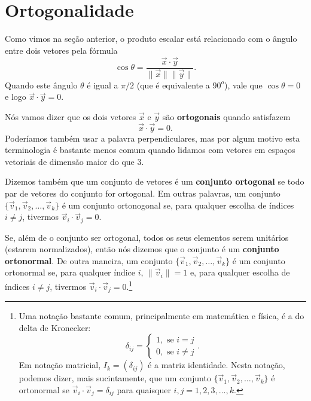 \section{Ortogonalidade}

Como vimos na seção anterior, o produto escalar está relacionado com o ângulo entre dois vetores pela fórmula
\begin{equation}
\cos \theta = \frac{\vec{x} \cdot \vec{y}}{\|\vec{x}\| \|\vec{y}\|}.
\end{equation} Quando este ângulo $\theta$ é igual a $\pi /2$ (que é equivalente a $90^o$), vale que $\cos \theta = 0$ e logo $\vec{x} \cdot \vec{y} = 0$.

Nós vamos dizer que os dois vetores $\vec{x}$ e $\vec{y}$ são \textbf{ortogonais} quando satisfazem
\begin{equation}
\vec{x} \cdot \vec{y} = 0.
\end{equation} Poderíamos também usar a palavra perpendiculares, mas por algum motivo esta terminologia é bastante menos comum quando lidamos com vetores em espaços vetoriais de dimensão maior do que $3$.

Dizemos também que um conjunto de vetores é um \textbf{conjunto ortogonal} se todo par de vetores do conjunto for ortogonal. Em outras palavras, um conjunto $\{\vec{v}_1, \vec{v}_2, \dots, \vec{v}_k\}$ é um conjunto ortonogonal se, para qualquer escolha de índices $i \neq j$, tivermos $\vec{v}_i \cdot \vec{v}_j = 0$.

Se, além de o conjunto ser ortogonal, todos os seus elementos serem unitários (estarem normalizados), então nós dizemos que o conjunto é um \textbf{conjunto ortonormal}. De outra maneira, um conjunto $\{\vec{v}_1, \vec{v}_2, \dots, \vec{v}_k\}$ é um conjunto ortonormal se, para qualquer índice $i$, $\|\vec{v}_i\| = 1$ e, para qualquer escolha de índices $i \neq j$, tivermos $\vec{v}_i \cdot \vec{v}_j = 0$.\footnote{Uma notação bastante comum, principalmente em matemática e física, é a do delta de Kronecker:\begin{equation} \delta_{ij} = \left\lbrace \begin{array}{l}
	1, \text{ se } i = j \\
	0, \text{ se } i \neq j
	\end{array} \right. . \end{equation} Em notação matricial, $I_k = (\delta_{ij})$ é a matriz identidade. Nesta notação, podemos dizer, mais sucintamente, que um conjunto $\{\vec{v}_1, \vec{v}_2, \dots, \vec{v}_k\}$ é ortonormal se $\vec{v}_i \cdot \vec{v}_j = \delta_{ij}$ para quaisquer $i,j = 1, 2, 3, \dots, k$.}

